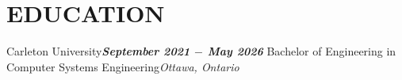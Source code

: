 \section{\textbf {\large EDUCATION}}
    \resumeSubHeadingListStart %

    \resumeSubheading %
    {Carleton University}{\emph{\textbf{September 2021 $-$ May 2026}}}
    {Bachelor of Engineering in Computer Systems Engineering}{\emph{Ottawa, Ontario}}

    \resumeSubHeadingListEnd %